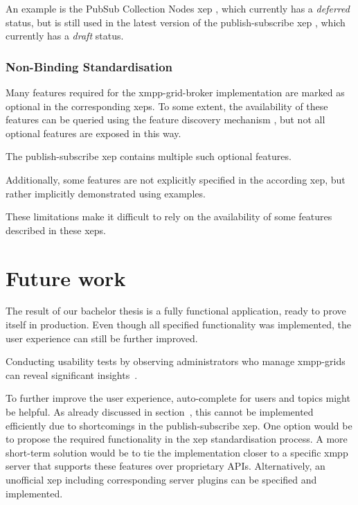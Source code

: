 An example is the PubSub Collection Nodes \gls{xep} \cite{xep-0248}, which currently has a \emph{deferred} status, but is still used in the latest version of the \gls{publish-subscribe} \gls{xep} \cite{xep-0060}, which currently has a \emph{draft} status.

\subsubsection{Non-Binding Standardisation}

Many features required for the \gls{xmpp-grid-broker} implementation are marked as optional in the corresponding \glspl{xep}.
To some extent, the availability of these features can be queried using the feature discovery mechanism \cite{xep-0030}, but not all optional features are exposed in this way.

The \gls{publish-subscribe} \gls{xep} contains multiple such optional features.

Additionally, some features are not explicitly specified in the according \gls{xep}, but rather implicitly demonstrated using examples.

These limitations make it difficult to rely on the availability of some features described in these \glspl{xep}.


\section{Future work}
The result of our bachelor thesis is a fully functional application, ready to prove itself in production.
Even though all specified functionality was implemented, the user experience can still be further improved.

Conducting usability tests by observing administrators who manage \glspl{xmpp-grid} can reveal significant insights~\cite{krug:dont-make-me-think}.

To further improve the user experience, auto-complete for users and topics might be helpful.
As already discussed in section~, this cannot be implemented efficiently due to shortcomings in the \gls{publish-subscribe} \gls{xep}.
One option would be to propose the required functionality in the \gls{xep} standardisation process.
A more short-term solution would be to tie the implementation closer to a specific \gls{xmpp} server that supports these features over proprietary APIs.
Alternatively, an unofficial \gls{xep} including corresponding server plugins can be specified and implemented.

